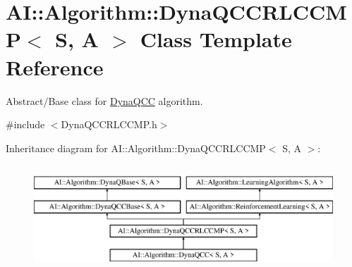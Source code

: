 \hypertarget{classAI_1_1Algorithm_1_1DynaQCCRLCCMP}{\section{A\-I\-:\-:Algorithm\-:\-:Dyna\-Q\-C\-C\-R\-L\-C\-C\-M\-P$<$ S, A $>$ Class Template Reference}
\label{classAI_1_1Algorithm_1_1DynaQCCRLCCMP}
}


Abstract/\-Base class for \hyperlink{classAI_1_1Algorithm_1_1DynaQCC}{Dyna\-Q\-C\-C} algorithm.  




{\ttfamily \#include $<$Dyna\-Q\-C\-C\-R\-L\-C\-C\-M\-P.\-h$>$}

Inheritance diagram for A\-I\-:\-:Algorithm\-:\-:Dyna\-Q\-C\-C\-R\-L\-C\-C\-M\-P$<$ S, A $>$\-:\begin{figure}[H]
\begin{center}
\leavevmode
\includegraphics[height=4.000000cm]{classAI_1_1Algorithm_1_1DynaQCCRLCCMP}
\end{center}
\end{figure}
